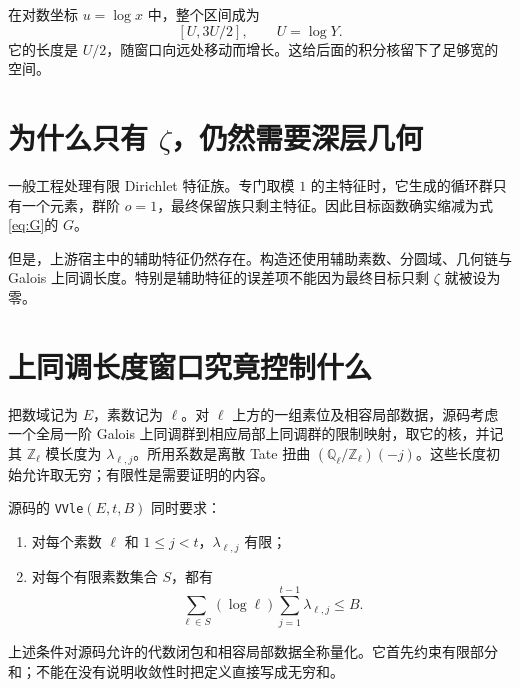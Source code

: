 在对数坐标 $u=\log x$ 中，整个区间成为
\[
[U,3U/2],\qquad U=\log Y.
\]
它的长度是 $U/2$，随窗口向远处移动而增长。这给后面的积分核留下了足够宽的空间。

\begin{center}
\end{center}

\section{为什么只有 $\zeta$，仍然需要深层几何}
一般工程处理有限 Dirichlet 特征族。专门取模 $1$ 的主特征时，它生成的循环群只有一个元素，群阶 $o=1$，最终保留族只剩主特征。因此目标函数确实缩减为式\eqref{eq:G}的 $G$。

但是，上游宿主中的辅助特征仍然存在。构造还使用辅助素数、分圆域、几何链与 Galois 上同调长度。特别是辅助特征的误差项不能因为最终目标只剩 $\zeta$ 就被设为零。


\section{上同调长度窗口究竟控制什么}
\label{sec:arith-length}
把数域记为 $E$，素数记为 $\ell$。对 $\ell$ 上方的一组素位及相容局部数据，源码考虑一个全局一阶 Galois 上同调群到相应局部上同调群的限制映射，取它的核，并记其 $\mathbb Z_\ell$ 模长度为 $\lambda_{\ell,j}$。所用系数是离散 Tate 扭曲 $(\mathbb Q_\ell/\mathbb Z_\ell)(-j)$。这些长度初始允许取无穷；有限性是需要证明的内容。

源码的 \texttt{VVle}$(E,t,B)$ 同时要求：
\begin{enumerate}
\item 对每个素数 $\ell$ 和 $1\le j<t$，$\lambda_{\ell,j}$ 有限；
\item 对每个有限素数集合 $S$，都有
\begin{equation}
\sum_{\ell\in S}(\log\ell)\sum_{j=1}^{t-1}\lambda_{\ell,j}\le B.
\label{eq:arith-vv-partial}
\end{equation}
\end{enumerate}
上述条件对源码允许的代数闭包和相容局部数据全称量化。它首先约束有限部分和；不能在没有说明收敛性时把定义直接写成无穷和。

